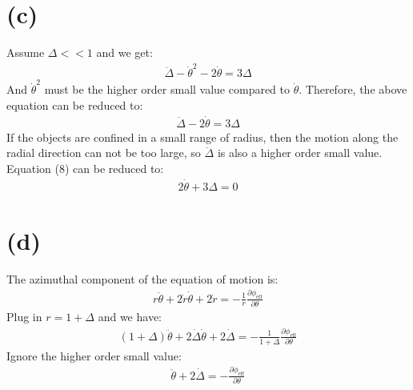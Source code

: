 \documentclass[a4paper,12pt]{article}
\begin{document}
\section*{(c)}
Assume $\Delta << 1$ and we get:
\begin{align*}
    \ddot{\Delta} - \dot{\theta}^2 - 2\dot{\theta} = 3\Delta
\end{align*}
And $\dot{\theta}^2$ must be the higher order small value compared to $\dot{\theta}$. 
Therefore, the above equation can be reduced to:
\begin{align*}
    \ddot{\Delta} - 2\dot{\theta} = 3\Delta
\end{align*}
If the objects are confined in a small range of radius, then the motion 
along the radial direction can not be too large, so $\ddot{\Delta}$ is also a 
higher order small value. Equation (8) can be reduced to:
\begin{align*}
    2\dot{\theta} + 3\Delta = 0
\end{align*}

\section*{(d)}
The azimuthal component of the equation of motion is:
\begin{align*}
    r\ddot{\theta} + 2\dot{r}\dot{\theta} +2 \dot{r}= - \frac{1}{r}\frac{\partial \phi_{\text{eff}}}{\partial \theta}
\end{align*}
Plug in $r = 1 + \Delta$ and we have:
\begin{align*}
    (1 + \Delta) \ddot{\theta} + 2 \dot{\Delta} \dot{\theta} + 2 \dot{\Delta} = -\frac{1}{1+\Delta} \frac{\partial \phi_{\text{eff}}}{\partial \theta}
\end{align*}
Ignore the higher order small value:
\begin{align*}
    \ddot{\theta} + 2 \dot{\Delta} = -\frac{\partial \phi_{\text{eff}}}{\partial \theta}
\end{align*}
\end{document}
